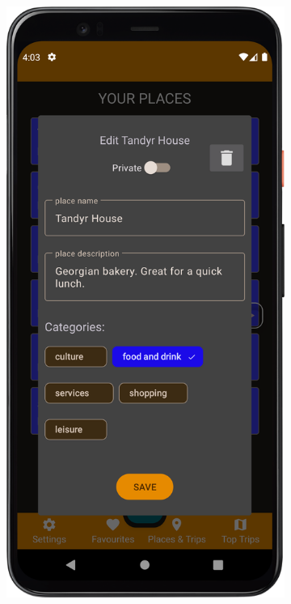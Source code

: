         \vspace{1cm}
        \begin{figure}[H]
            \centering
            \begin{subfigure}[b]{0.3\textwidth}
                \centering
                \includegraphics[width=\textwidth]{src/app/edit_place.png}

\end{subfigure}
\end{figure}
